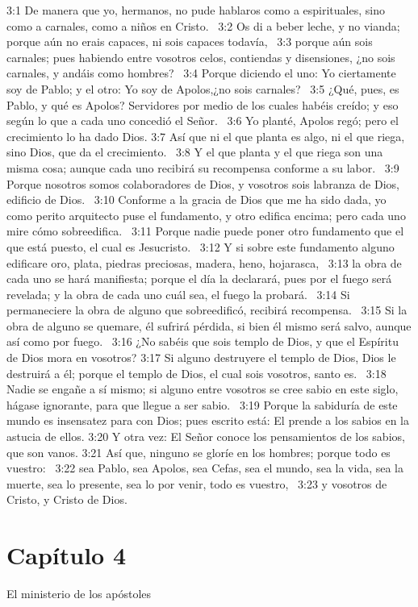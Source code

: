 3:1 De manera que yo, hermanos, no pude hablaros como a espirituales, sino como a carnales, como a niños en Cristo.  
3:2 Os di a beber leche, y no vianda; porque aún no erais capaces, ni sois capaces todavía,  
3:3 porque aún sois carnales; pues habiendo entre vosotros celos, contiendas y disensiones, ¿no sois carnales, y andáis como hombres?  
3:4 Porque diciendo el uno: Yo ciertamente soy de Pablo; y el otro: Yo soy de Apolos,¿no sois carnales?  
3:5 ¿Qué, pues, es Pablo, y qué es Apolos? Servidores por medio de los cuales habéis creído; y eso según lo que a cada uno concedió el Señor.  
3:6 Yo planté, Apolos regó; pero el crecimiento lo ha dado Dios. 
3:7 Así que ni el que planta es algo, ni el que riega, sino Dios, que da el crecimiento.  
3:8 Y el que planta y el que riega son una misma cosa; aunque cada uno recibirá su recompensa conforme a su labor.  
3:9 Porque nosotros somos colaboradores de Dios, y vosotros sois labranza de Dios, edificio de Dios.  
3:10 Conforme a la gracia de Dios que me ha sido dada, yo como perito arquitecto puse el fundamento, y otro edifica encima; pero cada uno mire cómo sobreedifica.  
3:11 Porque nadie puede poner otro fundamento que el que está puesto, el cual es Jesucristo.  
3:12 Y si sobre este fundamento alguno edificare oro, plata, piedras preciosas, madera, heno, hojarasca,  
3:13 la obra de cada uno se hará manifiesta; porque el día la declarará, pues por el fuego será revelada; y la obra de cada uno cuál sea, el fuego la probará.  
3:14 Si permaneciere la obra de alguno que sobreedificó, recibirá recompensa.  
3:15 Si la obra de alguno se quemare, él sufrirá pérdida, si bien él mismo será salvo, aunque así como por fuego. 
3:16 ¿No sabéis que sois templo de Dios, y que el Espíritu de Dios mora en vosotros? 
3:17 Si alguno destruyere el templo de Dios, Dios le destruirá a él; porque el templo de Dios, el cual sois vosotros, santo es.  
3:18 Nadie se engañe a sí mismo; si alguno entre vosotros se cree sabio en este siglo, hágase ignorante, para que llegue a ser sabio.  
3:19 Porque la sabiduría de este mundo es insensatez para con Dios; pues escrito está: El prende a los sabios en la astucia de ellos. 
3:20 Y otra vez: El Señor conoce los pensamientos de los sabios, que son vanos. 
3:21 Así que, ninguno se gloríe en los hombres; porque todo es vuestro:  
3:22 sea Pablo, sea Apolos, sea Cefas, sea el mundo, sea la vida, sea la muerte, sea lo presente, sea lo por venir, todo es vuestro,  
3:23 y vosotros de Cristo, y Cristo de Dios.  
\section*{Capítulo 4}
El ministerio de los apóstoles  

